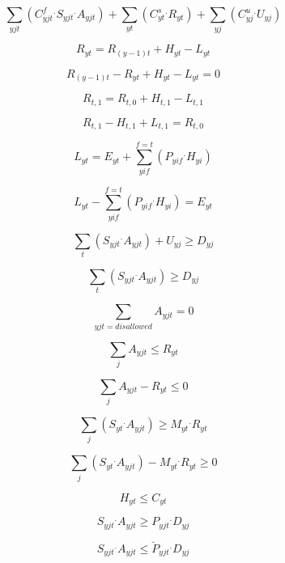 
$$\sum_{yjt} (C_{yjt}^{f} { ^.} S_{yjt} { ^.} A_{yjt}) + \sum_{yt} (C_{yt}^{s} { ^.} R_{yt}) + \sum_{yj} (C_{yj}^{u} { ^.} U_{yj})$$

$$ R_{yt} = R_{(y-1)t} + H_{yt} - L_{yt} $$

$$ R_{(y-1)t} - R_{yt} + H_{yt} - L_{yt} = 0 $$

$$ R_{t,1} = R_{t,0} + H_{t,1} - L_{t,1} $$

$$ R_{t,1} - H_{t,1} + L_{t,1} =  R_{t,0} $$

$$ L_{yt} = E_{yt} + \sum_{yif}^{f=t} (P_{yif} { ^.} H_{yi} ) $$

$$ L_{yt} - \sum_{yif}^{f=t} (P_{yif} { ^.} H_{yi}) = E_{yt} $$

$$ \sum_t (S_{yjt} { ^.} A_{yjt}) + U_{yj} \geq D_{yj} $$

$$ \sum_t (S_{yjt} { ^.} A_{yjt}) \geq D_{yj} $$

$$ \sum_{yjt=disallowed} A_{yjt} = 0 $$

$$ \sum_j A_{yjt} \leq R_{yt} $$

$$ \sum_j A_{yjt} - R_{yt} \leq 0 $$

$$ \sum_j (S_{yt} { ^.} A_{yjt}) \geq M_{yt} { ^.} R_{yt} $$

$$ \sum_j (S_{yt} { ^.} A_{yjt}) - M_{yt} { ^.} R_{yt} \geq 0 $$

$$ H_{yt} \leq C_{yt} $$

$$ S_{yjt} { ^.} A_{yjt} \geq P_{yjt} { ^.} D_{yj} $$

$$ S_{yjt} { ^.} A_{yjt} \leq {\breve{P}}_{yjt} { ^.} D_{yj} $$

